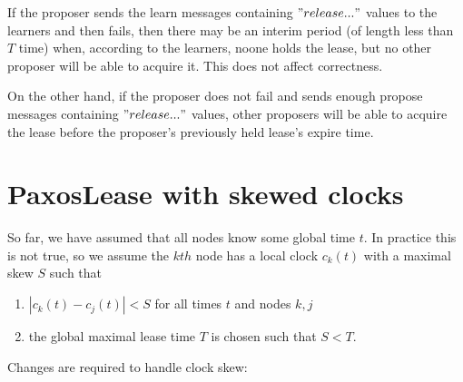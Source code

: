 \documentclass[12pt]{amsart}
\begin{document}
If the proposer sends the learn messages containing $"release..."$ values to the learners and then fails, then there may be an interim period (of length less than $T$ time) when, according to the learners, noone holds the lease, but no other proposer will be able to acquire it. This does not affect correctness.

On the other hand, if the proposer does not fail and sends enough propose messages containing $"release..."$ values, other proposers will be able to acquire the lease before the proposer's previously held lease's expire time.

\section{ PaxosLease with skewed clocks }

So far, we have assumed that all nodes know some global time $t$. In practice this is not true, so we assume the $kth$ node has a local clock $c_k(t)$ with a maximal skew $S$ such that

\begin{enumerate}

\item $|c_k(t) - c_j(t)| < S$ for all times $t$ and nodes $k, j$

\item the global maximal lease time $T$ is chosen such that $S < T$.

\end{enumerate}

Changes are required to handle clock skew:
\end{document}
